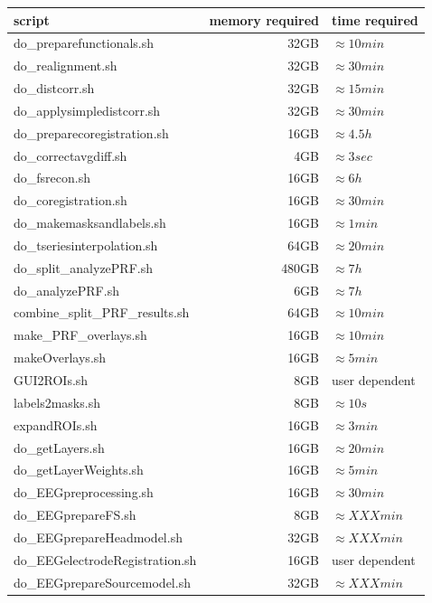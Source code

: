 \documentclass[12pt,a4paper]{scrartcl}
\begin{document}
\begin{table}[h]
\centering
\begin{tabular}{l | r | l}
\toprule
script & memory required & time required\\\hline
	do\_preparefunctionals.sh & 32GB & $\approx 10min$ \\\hline
  do\_realignment.sh & 32GB & $\approx 30min$ \\\hline
  do\_distcorr.sh & 32GB & $\approx 15min$ \\\hline
  do\_applysimpledistcorr.sh & 32GB & $\approx 30min$ \\\hline
  do\_preparecoregistration.sh & 16GB & $\approx 4.5h$ \\\hline
  do\_correctavgdiff.sh & 4GB & $\approx 3sec$ \\\hline
	do\_fsrecon.sh & 16GB & $\approx 6h$ \\\hline
  do\_coregistration.sh & 16GB & $\approx 30min$ \\\hline
	do\_makemasksandlabels.sh & 16GB & $\approx 1min$ \\\hline
	do\_tseriesinterpolation.sh & 64GB & $\approx 20min$ \\\hline
	do\_split\_analyzePRF.sh & 480GB & $\approx 7h$ \\\hline
  do\_analyzePRF.sh & 6GB & $\approx 7h$ \\\hline
	combine\_split\_PRF\_results.sh & 64GB & $\approx 10min$ \\\hline
  make\_PRF\_overlays.sh & 16GB & $\approx 10min$ \\\hline
	makeOverlays.sh & 16GB & $\approx 5min$\\\hline
	GUI2ROIs.sh & 8GB & user dependent \\\hline
  labels2masks.sh & 8GB & $\approx 10s$ \\\hline
  expandROIs.sh & 16GB & $\approx 3min$ \\\hline
  do\_getLayers.sh & 16GB & $\approx 20min$ \\\hline
  do\_getLayerWeights.sh & 16GB & $\approx 5min$ \\\hline
  do\_EEGpreprocessing.sh & 16GB & $\approx 30min$ \\\hline
  do\_EEGprepareFS.sh & 8GB & $\approx XXXmin$ \\\hline
  do\_EEGprepareHeadmodel.sh & 32GB & $\approx XXXmin$ \\\hline
  do\_EEGelectrodeRegistration.sh & 16GB & user dependent \\\hline
  do\_EEGprepareSourcemodel.sh & 32GB & $\approx XXXmin$ \\\hline

\end{tabular}
\end{table}
\end{document}
